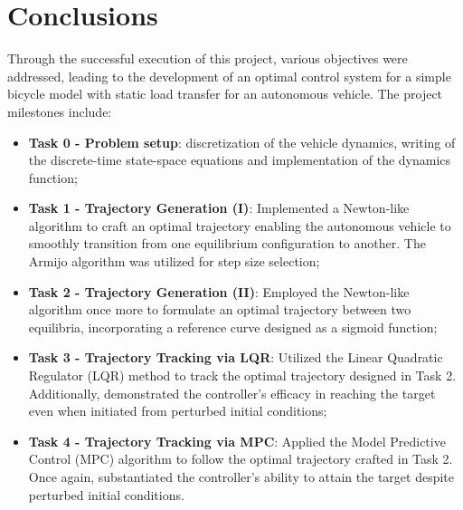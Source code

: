 \documentclass[a4paper,11pt,oneside]{book}
\begin{document}
\chapter*{Conclusions}
Through the successful execution of this project, various objectives were addressed, leading to the development of an optimal control system for a simple bicycle model with static load transfer for an autonomous vehicle. The project milestones include:
\begin{itemize}
    \item \textbf{Task 0 - Problem setup}: discretization of the vehicle dynamics, writing of the discrete-time state-space equations and implementation of the dynamics function;
    \item \textbf{Task 1 - Trajectory Generation (I)}: Implemented a Newton-like algorithm to craft an optimal trajectory enabling the autonomous vehicle to smoothly transition from one equilibrium configuration to another. The Armijo algorithm was utilized for step size selection;
    \item \textbf{Task 2 - Trajectory Generation (II)}: Employed the Newton-like algorithm once more to formulate an optimal trajectory between two equilibria, incorporating a reference curve designed as a sigmoid function;
    \item \textbf{Task 3 - Trajectory Tracking via LQR}: Utilized the Linear Quadratic Regulator (LQR) method to track the optimal trajectory designed in Task 2. Additionally, demonstrated the controller's efficacy in reaching the target even when initiated from perturbed initial conditions;
    \item \textbf{Task 4 - Trajectory Tracking via MPC}: Applied the Model Predictive Control (MPC) algorithm to follow the optimal trajectory crafted in Task 2. Once again, substantiated the controller's ability to attain the target despite perturbed initial conditions.
\end{itemize}

\end{document}
